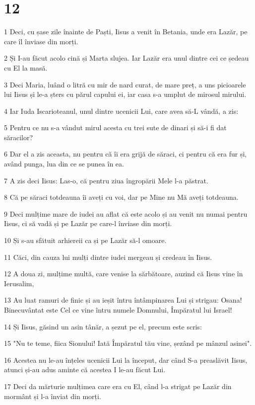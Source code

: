 \chapter{12}

\par 1 Deci, cu șase zile înainte de Paști, Iisus a venit în Betania, unde era Lazăr, pe care îl înviase din morți.
\par 2 Și I-au făcut acolo cină și Marta slujea. Iar Lazăr era unul dintre cei ce ședeau cu El la masă.
\par 3 Deci Maria, luând o litră cu mir de nard curat, de mare preț, a uns picioarele lui Iisus și le-a șters cu părul capului ei, iar casa s-a umplut de mirosul mirului.
\par 4 Iar Iuda Iscarioteanul, unul dintre ucenicii Lui, care avea să-L vândă, a zis:
\par 5 Pentru ce nu s-a vândut mirul acesta cu trei sute de dinari și să-i fi dat săracilor?
\par 6 Dar el a zis aceasta, nu pentru că îi era grijă de săraci, ci pentru că era fur și, având punga, lua din ce se punea în ea.
\par 7 A zis deci Iisus: Las-o, că pentru ziua îngropării Mele l-a păstrat.
\par 8 Că pe săraci totdeauna îi aveți cu voi, dar pe Mine nu Mă aveți totdeauna.
\par 9 Deci mulțime mare de iudei au aflat că este acolo și au venit nu numai pentru Iisus, ci să vadă și pe Lazăr pe care-l înviase din morți.
\par 10 Și s-au sfătuit arhiereii ca și pe Lazăr să-l omoare.
\par 11 Căci, din cauza lui mulți dintre iudei mergeau și credeau în Iisus.
\par 12 A doua zi, mulțime multă, care venise la sărbătoare, auzind că Iisus vine în Ierusalim,
\par 13 Au luat ramuri de finic și au ieșit întru întâmpinarea Lui și strigau: Osana! Binecuvântat este Cel ce vine întru numele Domnului, Împăratul lui Israel!
\par 14 Și Iisus, găsind un asin tânăr, a șezut pe el, precum este scris:
\par 15 "Nu te teme, fiica Sionului! Iată Împăratul tău vine, șezând pe mânzul asinei".
\par 16 Acestea nu le-au înțeles ucenicii Lui la început, dar când S-a preaslăvit Iisus, atunci și-au adus aminte că acestea I le-au făcut Lui.
\par 17 Deci da mărturie mulțimea care era cu El, când l-a strigat pe Lazăr din mormânt și l-a înviat din morți.
